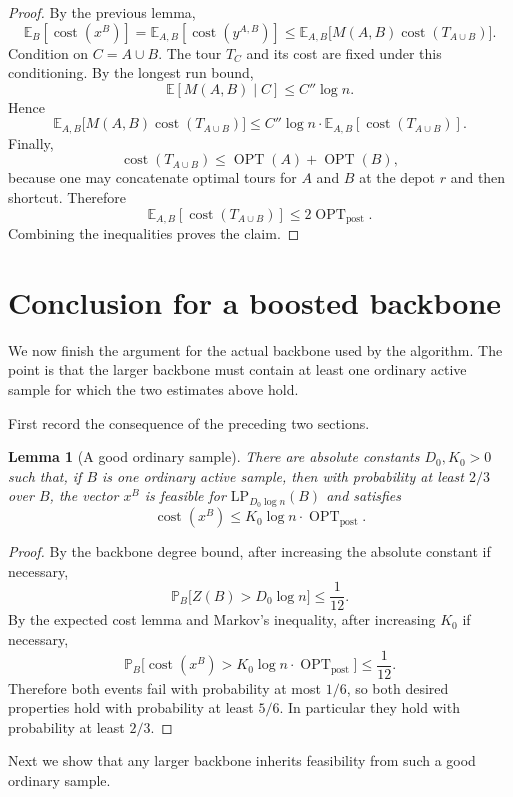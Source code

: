 \documentclass[11pt]{article}
\newtheorem{lemma}{Lemma}
\DeclareMathOperator{\OPT}{OPT}
\newcommand{\E}{\mathbb{E}}
\newcommand{\Prb}{\mathbb{P}}
\newcommand{\1}{\mathbf{1}}
\newcommand{\cost}{\operatorname{cost}}
\begin{document}
\begin{proof}
By the previous lemma,
\[
  \E_B[\cost(x^B)]
  =\E_{A,B}[\cost(y^{A,B})]
  \le \E_{A,B}\bigl[M(A,B)\cost(T_{A\cup B})\bigr].
\]
Condition on $C=A\cup B$.  The tour $T_C$ and its cost are fixed under this
conditioning.  By the longest run bound,
\[
  \E[M(A,B)\mid C]\le C''\log n.
\]
Hence
\[
  \E_{A,B}\bigl[M(A,B)\cost(T_{A\cup B})\bigr]
  \le C''\log n\cdot \E_{A,B}[\cost(T_{A\cup B})].
\]
Finally,
\[
  \cost(T_{A\cup B})\le \OPT(A)+\OPT(B),
\]
because one may concatenate optimal tours for $A$ and $B$ at the depot $r$ and
then shortcut.  Therefore
\[
  \E_{A,B}[\cost(T_{A\cup B})]
  \le 2\OPT_{\mathrm{post}}.
\]
Combining the inequalities proves the claim.
\end{proof}

\section{Conclusion for a boosted backbone}

We now finish the argument for the actual backbone used by the algorithm.  The
point is that the larger backbone must contain at least one ordinary active
sample for which the two estimates above hold.

First record the consequence of the preceding two sections.

\begin{lemma}[A good ordinary sample]
\label{lem:good-ordinary-sample}
There are absolute constants $D_0,K_0>0$ such that, if $B$ is one ordinary
active sample, then with probability at least $2/3$ over $B$, the vector $x^B$
is feasible for $\mathrm{LP}_{D_0\log n}(B)$ and satisfies
\[
  \cost(x^B)\le K_0\log n\cdot \OPT_{\mathrm{post}}.
\]
\end{lemma}

\begin{proof}
By the backbone degree bound, after increasing the absolute constant if
necessary,
\[
  \Prb_B\bigl[ Z(B)>D_0\log n\bigr]\le \frac1{12}.
\]
By the expected cost lemma and Markov's inequality, after increasing $K_0$ if
necessary,
\[
  \Prb_B\bigl[\cost(x^B)>K_0\log n\cdot \OPT_{\mathrm{post}}\bigr]
  \le \frac1{12}.
\]
Therefore both events fail with probability at most $1/6$, so both desired
properties hold with probability at least $5/6$.  In particular they hold with
probability at least $2/3$.
\end{proof}

Next we show that any larger backbone inherits feasibility from such a good
ordinary sample.
\end{document}
